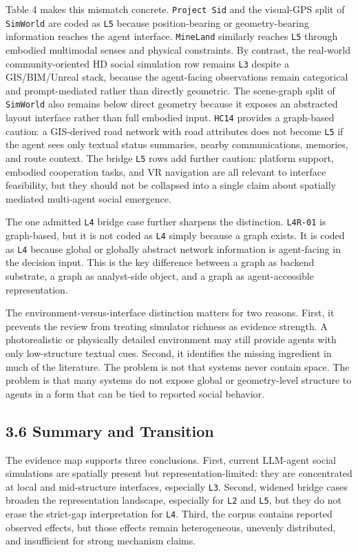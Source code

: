 \documentclass[
  twocolumn]{article}
\begin{document}
Table 4 makes this mismatch concrete. \texttt{Project\ Sid} and the
visual-GPS split of \texttt{SimWorld} are coded as \texttt{L5} because
position-bearing or geometry-bearing information reaches the agent
interface. \texttt{MineLand} similarly reaches \texttt{L5} through
embodied multimodal senses and physical constraints. By contrast, the
real-world community-oriented HD social simulation row remains
\texttt{L3} despite a GIS/BIM/Unreal stack, because the agent-facing
observations remain categorical and prompt-mediated rather than directly
geometric. The scene-graph split of \texttt{SimWorld} also remains below
direct geometry because it exposes an abstracted layout interface rather
than full embodied input. \texttt{HC14} provides a graph-based caution:
a GIS-derived road network with road attributes does not become
\texttt{L5} if the agent sees only textual status summaries, nearby
communications, memories, and route context. The bridge \texttt{L5} rows
add further caution: platform support, embodied cooperation tasks, and
VR navigation are all relevant to interface feasibility, but they should
not be collapsed into a single claim about spatially mediated
multi-agent social emergence.

The one admitted \texttt{L4} bridge case further sharpens the
distinction. \texttt{L4R-01} is graph-based, but it is not coded as
\texttt{L4} simply because a graph exists. It is coded as \texttt{L4}
because global or globally abstract network information is agent-facing
in the decision input. This is the key difference between a graph as
backend substrate, a graph as analyst-side object, and a graph as
agent-accessible representation.

The environment-versus-interface distinction matters for two reasons.
First, it prevents the review from treating simulator richness as
evidence strength. A photorealistic or physically detailed environment
may still provide agents with only low-structure textual cues. Second,
it identifies the missing ingredient in much of the literature. The
problem is not that systems never contain space. The problem is that
many systems do not expose global or geometry-level structure to agents
in a form that can be tied to reported social behavior.

\subsection{3.6 Summary and Transition}\label{summary-and-transition}

The evidence map supports three conclusions. First, current LLM-agent
social simulations are spatially present but representation-limited:
they are concentrated at local and mid-structure interfaces, especially
\texttt{L3}. Second, widened bridge cases broaden the representation
landscape, especially for \texttt{L2} and \texttt{L5}, but they do not
erase the strict-gap interpretation for \texttt{L4}. Third, the corpus
contains reported observed effects, but those effects remain
heterogeneous, unevenly distributed, and insufficient for strong
mechanism claims.
\end{document}
